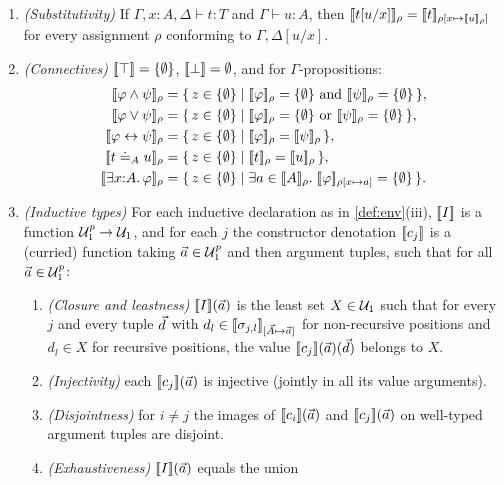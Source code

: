 \begin{definition}
\begin{enumerate}[label=(M\arabic*),leftmargin=3.2em]
\item \label{M:subst} \emph{(Substitutivity)}
  If $\Gamma, x{:}A, \Delta \vdash t : T$ and $\Gamma \vdash u : A$,
  then $[\![ t[u/x] ]\!]_{\rho} = [\![ t ]\!]_{\rho[x \mapsto [\![ u ]\!]_{\rho}]}$
  for every assignment $\rho$ conforming to $\Gamma, \Delta[u/x]$.
\item \label{M:conn} \emph{(Connectives)}
  $[\![ \top ]\!] = \{\emptyset\}$, $[\![ \bot ]\!] = \emptyset$, and for
  $\Gamma$-propositions:
  \begin{align*}
  \semr{\varphi \wedge \psi}{\rho} &= \setof{z \in \holds}{\semr{\varphi}{\rho} = \holds \text{ and } \semr{\psi}{\rho} = \holds}, \\
  \semr{\varphi \vee \psi}{\rho} &= \setof{z \in \holds}{\semr{\varphi}{\rho} = \holds \text{ or } \semr{\psi}{\rho} = \holds}, \\
  \semr{\varphi \leftrightarrow \psi}{\rho} &= \setof{z \in \holds}{\semr{\varphi}{\rho} = \semr{\psi}{\rho}}, \\
  \semr{t \ceq_A u}{\rho} &= \setof{z \in \holds}{\semr{t}{\rho} = \semr{u}{\rho}}, \\
  \semr{\cexists{x}{A}\varphi}{\rho} &= \setof{z \in \holds}{\exists a \in \semr{A}{\rho}.\; \semr{\varphi}{\rho[x \mapsto a]} = \holds}.
  \end{align*}
\item \label{M:ind} \emph{(Inductive types)}
  For each inductive declaration as in \cref{def:env}(iii),
  $[\![ I ]\!]$ is a function $\mathcal{U}_1^p \to \mathcal{U}_1$, and for each $j$ the
  constructor denotation $[\![ c_j ]\!]$ is a (curried) function taking
  $\vec{a} \in \mathcal{U}_1^p$ and then argument tuples, such that for all
  $\vec{a} \in \mathcal{U}_1^p$:
  \begin{enumerate}[label=(\alph*)]
  \item \emph{(Closure and leastness)} $[\![ I ]\!](\vec{a})$ is the
    least set $X \in \mathcal{U}_1$ such that for every $j$ and every tuple
    $\vec{d}$ with $d_l \in [\![ \sigma_{j,l} ]\!]_{[\vec{A} \mapsto
    \vec{a}]}$ for non-recursive positions and $d_l \in X$ for
    recursive positions, the value $[\![ c_j ]\!](\vec{a})(\vec{d})$
    belongs to $X$.
  \item \emph{(Injectivity)} each $[\![ c_j ]\!](\vec{a})$ is injective
    (jointly in all its value arguments).
  \item \emph{(Disjointness)} for $i \neq j$ the images of
    $[\![ c_i ]\!](\vec{a})$ and $[\![ c_j ]\!](\vec{a})$ on well-typed
    argument tuples are disjoint.
  \item \emph{(Exhaustiveness)} $[\![ I ]\!](\vec{a})$ equals the union

\end{enumerate}
\end{enumerate}
\end{definition}
